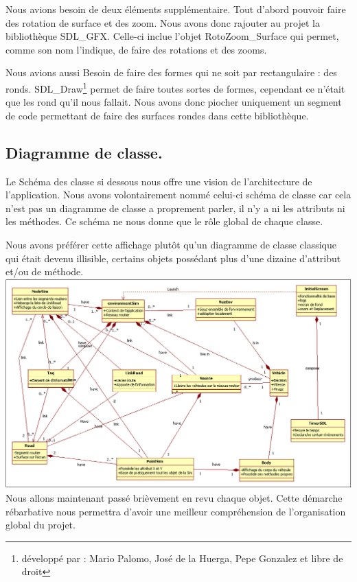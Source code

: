 \documentclass[a4paper,11pt]{article}
\begin{document}
Nous avions besoin de deux éléments supplémentaire. Tout d'abord pouvoir faire des rotation de surface et des zoom. Nous avons donc rajouter au projet la bibliothèque SDL\_GFX. Celle-ci inclue l'objet RotoZoom\_Surface qui permet, comme son nom l'indique, de faire des rotations et des zooms.

Nous avions aussi Besoin de faire des formes qui ne soit par rectangulaire : des ronds. SDL\_Draw\footnote{développé par : Mario Palomo, José de la Huerga, Pepe Gonzalez et libre de droit} permet de faire toutes sortes de formes, cependant ce n'était que les rond qu'il nous fallait. Nous avons donc piocher uniquement un segment de code permettant de faire des surfaces rondes dans cette bibliothèque.

\subsection{Diagramme de classe.}

Le Schéma des classe si dessous nous offre une vision de l'architecture de l'application. Nous avons volontairement nommé celui-ci schéma de classe car cela n'est pas un diagramme de classe a proprement parler, il n'y a ni les attributs ni les méthodes. Ce schéma ne nous donne que le rôle global de chaque classe. 

Nous avons préférer cette affichage plutôt qu'un diagramme de classe classique qui était devenu illisible, certains objets possédant plus d'une dizaine d'attribut et/ou de méthode.\\

\hspace{-2.5cm} \includegraphics[scale=0.45]{ligthYatsClassSchem.PNG}\\

Nous allons maintenant passé brièvement en revu chaque objet. Cette démarche rébarbative nous permettra d'avoir une meilleur compréhension de l'organisation global du projet.
\end{document}
